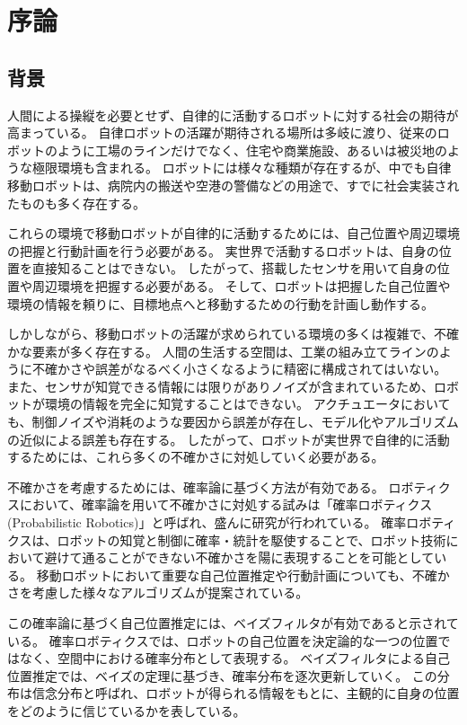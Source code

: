 \chapter{序論} \label{chapter:introduction}


\section{背景} \label{section:backglound}

人間による操縦を必要とせず、自律的に活動するロボットに対する社会の期待が高まっている。
自律ロボットの活躍が期待される場所は多岐に渡り、従来のロボットのように工場のラインだけでなく、住宅や商業施設、あるいは被災地のような極限環境も含まれる。
ロボットには様々な種類が存在するが、中でも自律移動ロボットは、病院内の搬送や空港の警備などの用途で、すでに社会実装されたものも多く存在する。

これらの環境で移動ロボットが自律的に活動するためには、自己位置や周辺環境の把握と行動計画を行う必要がある。
実世界で活動するロボットは、自身の位置を直接知ることはできない。 %
したがって、搭載したセンサを用いて自身の位置や周辺環境を把握する必要がある。
そして、ロボットは把握した自己位置や環境の情報を頼りに、目標地点へと移動するための行動を計画し動作する。

しかしながら、移動ロボットの活躍が求められている環境の多くは複雑で、不確かな要素が多く存在する。
人間の生活する空間は、工業の組み立てラインのように不確かさや誤差がなるべく小さくなるように精密に構成されてはいない。
また、センサが知覚できる情報には限りがありノイズが含まれているため、ロボットが環境の情報を完全に知覚することはできない。
アクチュエータにおいても、制御ノイズや消耗のような要因から誤差が存在し、モデル化やアルゴリズムの近似による誤差も存在する。
したがって、ロボットが実世界で自律的に活動するためには、これら多くの不確かさに対処していく必要がある。

不確かさを考慮するためには、確率論に基づく方法が有効である。
ロボティクスにおいて、確率論を用いて不確かさに対処する試みは「確率ロボティクス(Probabilistic Robotics)」と呼ばれ、盛んに研究が行われている\cite{thrun2005,上田2007prob}。
確率ロボティクスは、ロボットの知覚と制御に確率・統計を駆使することで、ロボット技術において避けて通ることができない不確かさを陽に表現することを可能としている。
移動ロボットにおいて重要な自己位置推定や行動計画についても、不確かさを考慮した様々なアルゴリズムが提案されている。

この確率論に基づく自己位置推定には、ベイズフィルタが有効であると示されている。
確率ロボティクスでは、ロボットの自己位置を決定論的な一つの位置ではなく、空間中における確率分布として表現する。
ベイズフィルタによる自己位置推定では、ベイズの定理に基づき、確率分布を逐次更新していく。
この分布は信念分布と呼ばれ、ロボットが得られる情報をもとに、主観的に自身の位置をどのように信じているかを表している。

